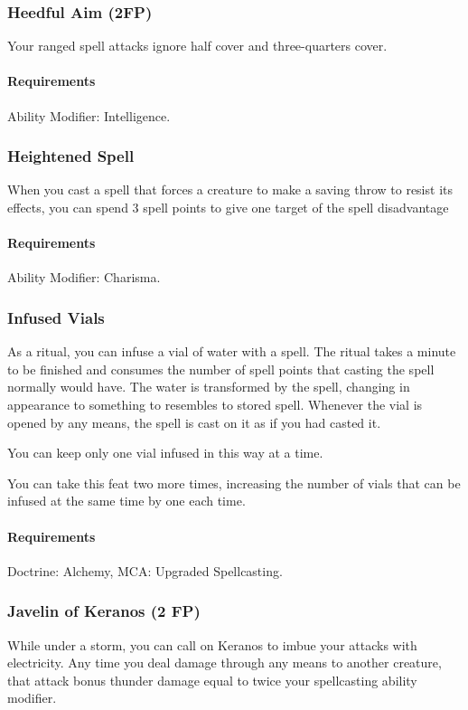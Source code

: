 \subsubsection{Heedful Aim (2FP)} \label{feat::heedfulaim}
    Your ranged spell attacks ignore half cover and three-quarters cover.
    \paragraph{Requirements} Ability Modifier: Intelligence.
\subsubsection{Heightened Spell} \label{feat::heightenedspell}
    When you cast a spell that forces a creature to make a saving throw to resist its effects, you can spend 3 spell points to give one target of the spell disadvantage
    \paragraph{Requirements} Ability Modifier: Charisma.
\subsubsection{Infused Vials} \label{feat::infusedvials}
    As a ritual, you can infuse a vial of water with a spell.
    The ritual takes a minute to be finished and consumes the number of spell points that casting the spell normally would have.
    The water is transformed by the spell, changing in appearance to something to resembles to stored spell.
    Whenever the vial is opened by any means, the spell is cast on it as if you had casted it.

    You can keep only one vial infused in this way at a time.

    You can take this feat two more times, increasing the number of vials that can be infused at the same time by one each time.
    \paragraph{Requirements} Doctrine: Alchemy, MCA: Upgraded Spellcasting.
\subsubsection{Javelin of Keranos (2 FP)} \label{feat::javelinofkeranos}
    While under a storm, you can call on Keranos to imbue your attacks with electricity.
    Any time you deal damage through any means to another creature, that attack bonus thunder damage equal to twice your spellcasting ability modifier.
